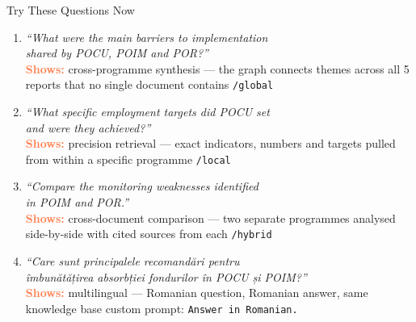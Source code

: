 \documentclass[aspectratio=169,11pt]{beamer}
\begin{document}
\begin{frame}{Try These Questions Now}
  \vspace{0.15cm}
  \begin{enumerate}\setlength\itemsep{10pt}
    \item \textit{``What were the main barriers to implementation\\
          shared by POCU, POIM and POR?''}\\
          {\small\textcolor{coral}{\textbf{Shows:}} \textcolor{midgray}{cross-programme synthesis — the graph connects themes
          across all 5 reports that no single document contains \quad
          \texttt{/global}}}

    \item \textit{``What specific employment targets did POCU set\\
          and were they achieved?''}\\
          {\small\textcolor{coral}{\textbf{Shows:}} \textcolor{midgray}{precision retrieval — exact indicators, numbers and
          targets pulled from within a specific programme \quad
          \texttt{/local}}}

    \item \textit{``Compare the monitoring weaknesses identified\\
          in POIM and POR.''}\\
          {\small\textcolor{coral}{\textbf{Shows:}} \textcolor{midgray}{cross-document comparison — two separate programmes
          analysed side-by-side with cited sources from each \quad
          \texttt{/hybrid}}}

    \item \textit{``Care sunt principalele recomandări pentru\\
          îmbunătățirea absorbției fondurilor în POCU și POIM?''}\\
          {\small\textcolor{coral}{\textbf{Shows:}} \textcolor{midgray}{multilingual — Romanian question, Romanian answer,
          same knowledge base \quad custom prompt: \texttt{Answer in Romanian.}}}
  \end{enumerate}
\end{frame}

\end{document}

